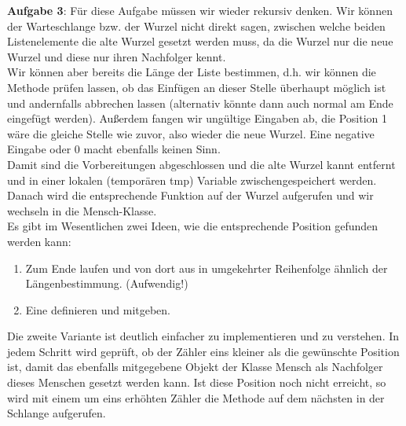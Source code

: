 \documentclass{article}
\begin{document}
\textbf{Aufgabe 3}:
Für diese Aufgabe müssen wir wieder rekursiv denken. Wir können der Warteschlange bzw. der Wurzel nicht direkt sagen, 
zwischen welche beiden Listenelemente die alte Wurzel gesetzt werden muss, da die Wurzel nur die neue Wurzel und 
diese nur ihren Nachfolger kennt. \\
Wir können aber bereits die Länge der Liste bestimmen, d.h. wir können die Methode prüfen lassen, ob das Einfügen 
an dieser Stelle überhaupt möglich ist und andernfalls abbrechen lassen (alternativ könnte dann auch normal 
am Ende eingefügt werden). Außerdem fangen wir ungültige Eingaben ab, die Position 1 wäre die gleiche Stelle wie zuvor,
also wieder die neue Wurzel. Eine negative Eingabe oder 0 macht ebenfalls keinen Sinn. \\
Damit sind die Vorbereitungen abgeschlossen und die alte Wurzel kannt entfernt und in einer lokalen (temporären tmp) 
Variable zwischengespeichert werden. Danach wird die entsprechende Funktion auf der Wurzel aufgerufen und wir wechseln 
in die Mensch-Klasse. \\
Es gibt im Wesentlichen zwei Ideen, wie die entsprechende Position gefunden werden kann:
\begin{enumerate}
    \item Zum Ende laufen und von dort aus in umgekehrter Reihenfolge  ähnlich der Längenbestimmung. (Aufwendig!)
    \item Eine  definieren und mitgeben.
\end{enumerate}
Die zweite Variante ist deutlich einfacher zu implementieren und zu verstehen. In jedem Schritt wird geprüft, ob der 
Zähler eins kleiner als die gewünschte Position ist, damit das ebenfalls mitgegebene Objekt der Klasse Mensch als 
Nachfolger dieses Menschen gesetzt werden kann. Ist diese Position noch nicht erreicht, so wird mit einem um eins erhöhten Zähler
die Methode auf dem nächsten in der Schlange aufgerufen. 
\end{document}
